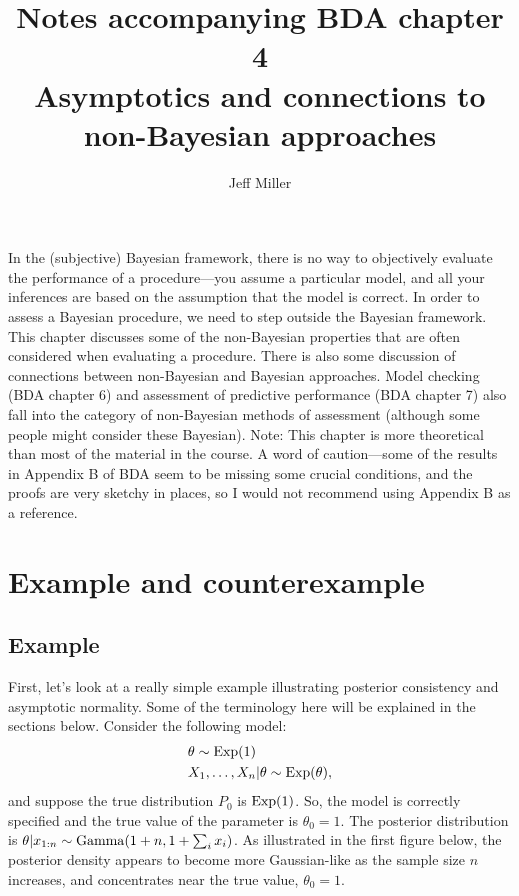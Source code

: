 \documentclass[12pt]{article}
\title{Notes accompanying BDA chapter 4\\
\large Asymptotics and connections to non-Bayesian approaches
}
\author{Jeff Miller}
\begin{document}
\maketitle

\tableofcontents
{}
\newpage



\vspace{2em}
In the (subjective) Bayesian framework, there is no way to objectively evaluate the performance of a procedure---you assume a particular model, and all your inferences are based on the assumption that the model is correct.  In order to assess a Bayesian procedure, we need to step outside the Bayesian framework. This chapter discusses some of the non-Bayesian properties that are often considered when evaluating a procedure. There is also some discussion of connections between non-Bayesian and Bayesian approaches.
Model checking (BDA chapter 6) and assessment of predictive performance (BDA chapter 7) also fall into the category of non-Bayesian methods of assessment (although some people might consider these Bayesian). 
Note: This chapter is more theoretical than most of the material in the course. A word of caution---some of the results in Appendix B of BDA seem to be missing some crucial conditions, and the proofs are very sketchy in places, so I would not recommend using Appendix B as a reference.



\section{Example and counterexample}

\subsection{Example}

First, let's look at a really simple example illustrating posterior consistency and asymptotic normality. Some of the terminology here will be explained in the sections below. Consider the following model:
\begin{align*}
& \theta \sim \operatorname*{Exp}(1)\\
& X_1,\ldots,X_n | \theta \sim \operatorname*{Exp}(\theta),
\end{align*}
and suppose the true distribution $P_0$ is $\operatorname*{Exp}(1)$.  So, the model is correctly specified and the true value of the parameter is $\theta_0 = 1$. The posterior distribution is $\theta | x_{1:n} \sim\operatorname*{Gamma}(1+n,1+\sum_i x_i)$. As illustrated in the first figure below, the posterior density appears to become more Gaussian-like as the sample size $n$ increases, and concentrates near the true value, $\theta_0 = 1$.
\end{document}
